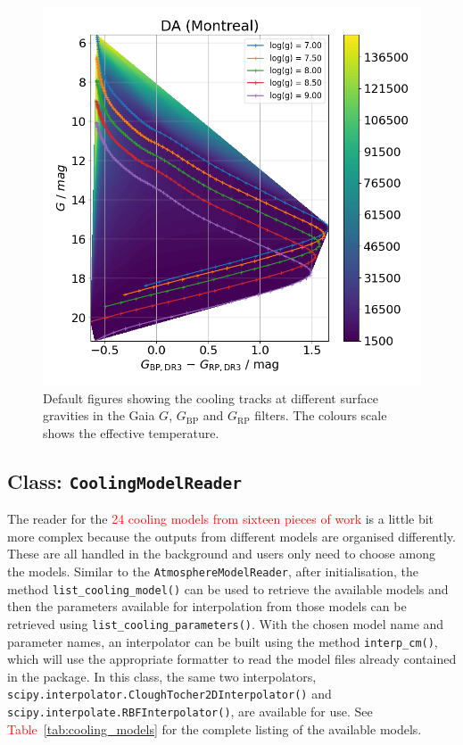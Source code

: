 \documentclass[fleqn,usenatbib]{rasti}
\begin{document}
\begin{figure}
    \centering
    \includegraphics[width=\columnwidth]{fig_01_DA_cooling_tracks_from_plotter.png}
    \caption{Default figures showing the cooling tracks at different surface
    gravities in the Gaia $G$, $G_{\mathrm{BP}}$ and $G_{\mathrm{RP}}$ filters.
    The colours scale shows the effective temperature.}
    \label{fig:cooling_tracks_default}
\end{figure}

\subsection{Class: \texttt{CoolingModelReader}}
The reader for the \textcolor{red}{24 cooling models from sixteen pieces of work}
is a little bit more complex because the outputs from different models are
organised differently. These are all handled in the background and users only
need to choose among the models. Similar to the \verb+AtmosphereModelReader+,
after initialisation, the method \verb+list_cooling_model()+ can be used to
retrieve the available models and then the parameters available for
interpolation from those models can be retrieved using
\verb+list_cooling_parameters()+. With the chosen model name and parameter
names, an interpolator can be built using the method \verb+interp_cm()+, which
will use the appropriate formatter to read the model files already contained in
the package. In this class, the same two interpolators,
\verb+scipy.interpolator.CloughTocher2DInterpolator()+ and
\verb+scipy.interpolate.RBFInterpolator()+, are available for use. See
\textcolor{red}{Table~\ref{tab:cooling_models}} for the complete listing of the
available models.
\end{document}
